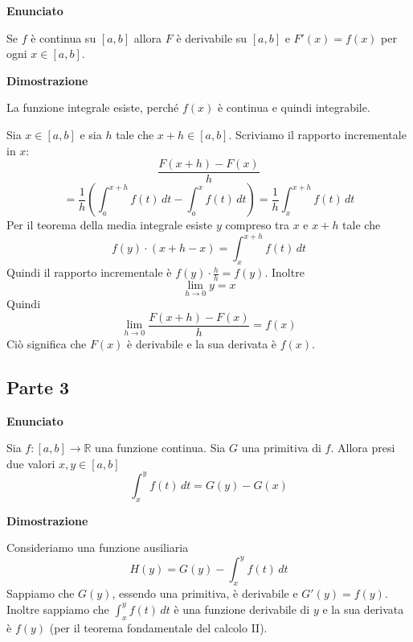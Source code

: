 \textbf{Enunciato}

Se $f$ è continua su $[a,b]$ allora $F$ è derivabile su $[a,b]$ e $F'(x) = f(x)$ per ogni $x \in [a,b]$.

\textbf{Dimostrazione}

La funzione integrale esiste, perché $f(x)$ è continua e quindi integrabile.

Sia $x \in [a,b]$ e sia $h$ tale che $x+h \in [a,b]$. Scriviamo il rapporto incrementale in $x$:
\begin{equation*}
\frac{F(x+h)-F(x)}{h}
\end{equation*}
\begin{equation*}
= \frac{1}{h} \left( \int_a^{x+h} f(t) \, dt - \int_a^x f(t) \, dt \right) = \frac{1}{h} \int_x^{x+h} f(t) \, dt
\end{equation*}
Per il teorema della media integrale esiste $y$ compreso tra $x$ e $x+h$ tale che
\begin{equation*}
f(y) \cdot (x+h-x) = \int_x^{x+h} f(t) \, dt
\end{equation*}
Quindi il rapporto incrementale è $f(y) \cdot \frac{h}{h} = f(y)$. Inoltre
\begin{equation*}
\lim_{h \to 0} y = x
\end{equation*}
Quindi
\begin{equation*}
\lim_{h \to 0} \frac{F(x+h)-F(x)}{h} = f(x)
\end{equation*}
Ciò significa che $F(x)$ è derivabile e la sua derivata è $f(x)$.

\subsection{Parte 3}

\textbf{Enunciato}

Sia $f:[a,b] \to \mathbb{R}$ una funzione continua. Sia $G$ una primitiva di $f$. Allora presi due valori $x,y \in [a,b]$
\begin{equation*}
\int_x^y f(t) \, dt = G(y) - G(x)
\end{equation*}

\textbf{Dimostrazione}

Consideriamo una funzione ausiliaria
\begin{equation*}
H(y) = G(y) - \int_x^y f(t) \, dt
\end{equation*}
Sappiamo che $G(y)$, essendo una primitiva, è derivabile e $G'(y) = f(y)$. Inoltre sappiamo che $\int_x^y f(t) \, dt$ è una funzione derivabile di $y$ e la sua derivata è $f(y)$ (per il teorema fondamentale del calcolo II).

